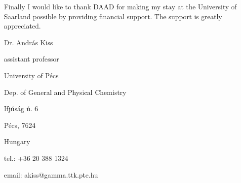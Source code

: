 \documentclass[a4paper, 11pt, oneside, bibliography=totoc]{article}
\begin{document}
Finally I would like to thank DAAD for making my stay at the University of Saarland possible by providing financial support. The support is greatly appreciated.
\newline

Dr. András Kiss

assistant professor

University of Pécs

Dep. of General and Physical Chemistry

Ifjúság ú. 6

Pécs, 7624

Hungary

tel.: +36 20 388 1324

email: akiss@gamma.ttk.pte.hu

{}

\end{document}

